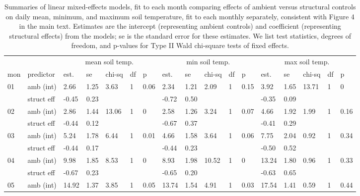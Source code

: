 \documentclass{article}
\begin{document}
\begin{table}[ht]
\centering
\caption{Summaries of linear mixed-effects models, fit to each month comparing effects of ambient versus structural controls on daily mean, minimum, and maximum soil temperature, fit to each monthly separately, consistent with Figure 4 in the main text. Estimates are the intercept (representing ambient controls) and coefficient (representing structural effects) from the models; se is the standard error for these estimates. We list test statistics, degrees of freedom, and p-values for Type II Wald chi-square tests of fixed effects.} 
\label{table:shamamb_stempm}
\begin{tabular}{|p{}|p{}|p{}p{}p{}p{}p{}|p{}p{}p{}p{}p{}|p{}p{}p{}p{}p{}|}
  \hline
  & &\multicolumn{5}{c}{mean soil temp.} &\multicolumn{5}{c}{min soil temp.} &\multicolumn{5}{c}{max soil temp.}\\
 mon & predictor & est. & se & chi-sq & df & p & est. & se & chi-sq & df & p & est. & se & chi-sq & df & p\\
 \hline
01 & amb (int) & 2.66 & 1.25 & 3.63 & 1 & 0.06 & 2.34 & 1.21 & 2.09 & 1 & 0.15 & 3.92 & 1.65 & 13.71 & 1 & 0 \\ 
    & struct eff & -0.45 & 0.23 &  &  &  & -0.72 & 0.50 &  &  &  & -0.35 & 0.09 &  &  &  \\ 
   \hline
02 & amb (int) & 2.86 & 1.44 & 13.06 & 1 & 0 & 2.58 & 1.26 & 3.24 & 1 & 0.07 & 4.66 & 1.92 & 1.99 & 1 & 0.16 \\ 
    & struct eff & -0.44 & 0.12 &  &  &  & -0.67 & 0.37 &  &  &  & -0.41 & 0.29 &  &  &  \\ 
   \hline
03 & amb (int) & 5.24 & 1.78 & 6.44 & 1 & 0.01 & 4.66 & 1.58 & 3.64 & 1 & 0.06 & 7.75 & 2.04 & 0.92 & 1 & 0.34 \\ 
    & struct eff & -0.44 & 0.17 &  &  &  & -0.44 & 0.23 &  &  &  & -0.50 & 0.52 &  &  &  \\ 
   \hline
04 & amb (int) & 9.98 & 1.85 & 8.53 & 1 & 0 & 8.93 & 1.98 & 10.52 & 1 & 0 & 13.24 & 1.80 & 0.96 & 1 & 0.33 \\ 
    & struct eff & -0.67 & 0.23 &  &  &  & -0.65 & 0.20 &  &  &  & -0.63 & 0.65 &  &  &  \\ 
   \hline
05 & amb (int) & 14.92 & 1.37 & 3.85 & 1 & 0.05 & 13.74 & 1.54 & 4.91 & 1 & 0.03 & 17.54 & 1.41 & 0.59 & 1 & 0.44 \\ 

\end{tabular}
\end{table}
\end{document}
